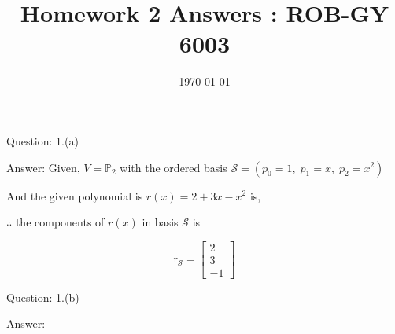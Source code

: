 \documentclass[a4paper]{article}
\title{Homework 2 Answers : ROB-GY 6003}
\author{\myName}
\date{\today}
\newcommand{\myName}{\textbf{Shantanu Ghodgaonkar}\\\textit{Univ ID}: N11344563\\\textit{Net ID}: sng8399\\\textit{Ph.No.}: +1 (929) 922-0614}
\begin{document}
	
	
	\begin{qalist}			
		\item[Question: 1.(a)] \setcounter{equation}{0} %
		\item[Answer:] Given, $V = {\mathbb{P}}_{2}$ with the ordered basis $\mathcal{S} = \left( {p}_{0} = 1,\;{p}_{1} = x,\;{p}_{2} = {x}^{2}\right)$ 
		
		And the given polynomial is $r(x) = 2 + 3x - {x}^{2}$ is, 
		
		
		$\therefore$ the components of $r(x)$ in basis $\mathcal{S}$ is 
		
		\begin{equation}
			{\text{r}}_{\mathcal{S}} = \begin{bmatrix} 2 \\ 3 \\ -1 \end{bmatrix}
		\end{equation}
		
		\item[Question: 1.(b)] \setcounter{equation}{0} %
		\item[Answer:] 
%
%
%
%
%
%
		
	\end{qalist}
\end{document}
